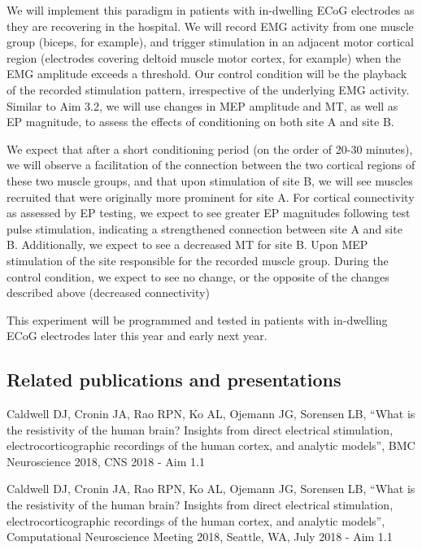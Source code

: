 We will implement this paradigm in patients with in-dwelling ECoG electrodes as they are recovering in the hospital. We will record EMG activity from one muscle group (biceps, for example), and trigger stimulation in an adjacent motor cortical region (electrodes covering deltoid muscle motor cortex, for example) when the EMG amplitude exceeds a threshold. Our control condition will be the playback of the recorded stimulation pattern, irrespective of the underlying EMG activity. Similar to Aim 3.2, we will use changes in MEP amplitude and MT, as well as EP magnitude, to assess the effects of conditioning on both site A and site B. 

We expect that after a short conditioning period (on the order of 20-30 minutes), we will observe a facilitation of the connection between the two cortical regions of these two muscle groups, and that upon stimulation of site B, we will see muscles recruited that were originally more prominent for site A. For cortical connectivity as assessed by EP testing, we expect to see greater EP magnitudes following test pulse stimulation, indicating a strengthened connection between site A and site B. Additionally, we expect to see a decreased MT for site B. Upon MEP stimulation of the site responsible for the recorded muscle group. During the control condition, we expect to see no change, or the opposite of the changes described above (decreased connectivity) 

This experiment will be programmed and tested in patients with in-dwelling ECoG electrodes later this year and early next year. 

\subsection{Related publications and presentations}

\noindent Caldwell DJ, Cronin JA, Rao RPN, Ko AL, Ojemann JG, Sorensen LB, “What is the resistivity of the human brain? Insights from direct electrical stimulation, electrocorticographic recordings of the human cortex, and analytic models”, BMC Neuroscience 2018, CNS 2018 - Aim 1.1
\medskip

\noindent Caldwell DJ, Cronin JA, Rao RPN, Ko AL, Ojemann JG, Sorensen LB, “What is the resistivity of the human brain? Insights from direct electrical stimulation, electrocorticographic recordings of the human cortex, and analytic models”, Computational Neuroscience Meeting 2018, Seattle, WA, July 2018 - Aim 1.1
\medskip

